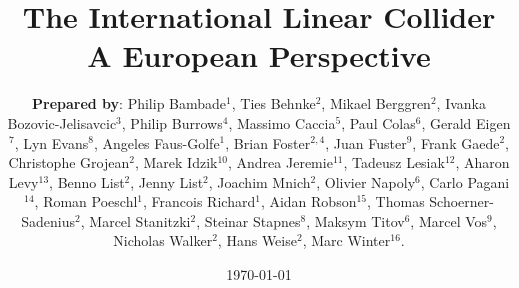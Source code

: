 \documentclass[%
 reprint,
 floatfix,
 amsmath,amssymb,
 aps,
]{revtex4-1}
\begin{document}

\title{The International Linear Collider \\ A European Perspective}%

\author{\textbf{Prepared by}:
Philip Bambade$^1$,  Ties Behnke$^2$, Mikael Berggren$^2$, Ivanka Bozovic-Jelisavcic$^3$, Philip Burrows$^4$, Massimo Caccia$^{5}$, Paul Colas$^{6}$, Gerald Eigen$^{7}$, Lyn Evans$^{8}$, Angeles Faus-Golfe$^{1}$, Brian Foster$^{2,4}$, Juan Fuster$^{9}$, Frank Gaede$^{2}$, Christophe Grojean$^{2}$, Marek Idzik$^{10}$, Andrea Jeremie$^{11}$, Tadeusz Lesiak$^{12}$, Aharon Levy$^{13}$, Benno List$^{2}$, Jenny List$^{2}$, Joachim Mnich$^{2}$, Olivier Napoly$^{6}$, Carlo Pagani$^{14}$, Roman Poeschl$^{1}$, Francois Richard$^{1}$, Aidan Robson$^{15}$, Thomas Schoerner-Sadenius$^{2}$, Marcel Stanitzki$^2$, Steinar Stapnes$^{8}$, Maksym Titov$^{6}$, Marcel Vos$^{9}$, Nicholas Walker$^{2}$, Hans Weise$^{2}$, Marc Winter$^{16}$. }




\date{\today}%
\end{document}
